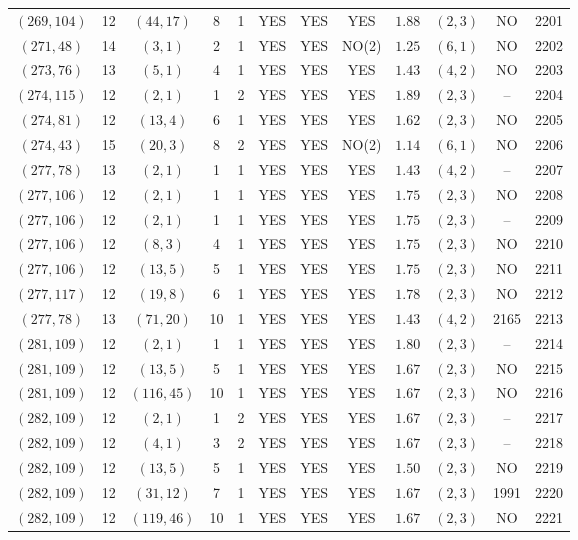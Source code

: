 \begin{longtable}{|c|c|c|c|c|c|c|c|c|c|c|c|}
$(269,104)$ & 12 & $(44,17)$ & 8 & 1 & YES & YES & YES & $1.88$ & $(2,3)$ & NO & 2201\\
$(271,48)$ & 14 & $(3,1)$ & 2 & 1 & YES & YES & NO(2) & $1.25$ & $(6,1)$ & NO & 2202\\
$(273,76)$ & 13 & $(5,1)$ & 4 & 1 & YES & YES & YES & $1.43$ & $(4,2)$ & NO & 2203\\
$(274,115)$ & 12 & $(2,1)$ & 1 & 2 & YES & YES & YES & $1.89$ & $(2,3)$ & -- & 2204\\
$(274,81)$ & 12 & $(13,4)$ & 6 & 1 & YES & YES & YES & $1.62$ & $(2,3)$ & NO & 2205\\
$(274,43)$ & 15 & $(20,3)$ & 8 & 2 & YES & YES & NO(2) & $1.14$ & $(6,1)$ & NO & 2206\\
$(277,78)$ & 13 & $(2,1)$ & 1 & 1 & YES & YES & YES & $1.43$ & $(4,2)$ & -- & 2207\\
$(277,106)$ & 12 & $(2,1)$ & 1 & 1 & YES & YES & YES & $1.75$ & $(2,3)$ & NO & 2208\\
$(277,106)$ & 12 & $(2,1)$ & 1 & 1 & YES & YES & YES & $1.75$ & $(2,3)$ & -- & 2209\\
$(277,106)$ & 12 & $(8,3)$ & 4 & 1 & YES & YES & YES & $1.75$ & $(2,3)$ & NO & 2210\\
$(277,106)$ & 12 & $(13,5)$ & 5 & 1 & YES & YES & YES & $1.75$ & $(2,3)$ & NO & 2211\\
$(277,117)$ & 12 & $(19,8)$ & 6 & 1 & YES & YES & YES & $1.78$ & $(2,3)$ & NO & 2212\\
$(277,78)$ & 13 & $(71,20)$ & 10 & 1 & YES & YES & YES & $1.43$ & $(4,2)$ & 2165 & 2213\\
$(281,109)$ & 12 & $(2,1)$ & 1 & 1 & YES & YES & YES & $1.80$ & $(2,3)$ & -- & 2214\\
$(281,109)$ & 12 & $(13,5)$ & 5 & 1 & YES & YES & YES & $1.67$ & $(2,3)$ & NO & 2215\\
$(281,109)$ & 12 & $(116,45)$ & 10 & 1 & YES & YES & YES & $1.67$ & $(2,3)$ & NO & 2216\\
$(282,109)$ & 12 & $(2,1)$ & 1 & 2 & YES & YES & YES & $1.67$ & $(2,3)$ & -- & 2217\\
$(282,109)$ & 12 & $(4,1)$ & 3 & 2 & YES & YES & YES & $1.67$ & $(2,3)$ & -- & 2218\\
$(282,109)$ & 12 & $(13,5)$ & 5 & 1 & YES & YES & YES & $1.50$ & $(2,3)$ & NO & 2219\\
$(282,109)$ & 12 & $(31,12)$ & 7 & 1 & YES & YES & YES & $1.67$ & $(2,3)$ & 1991 & 2220\\
$(282,109)$ & 12 & $(119,46)$ & 10 & 1 & YES & YES & YES & $1.67$ & $(2,3)$ & NO & 2221\\

\end{longtable}
